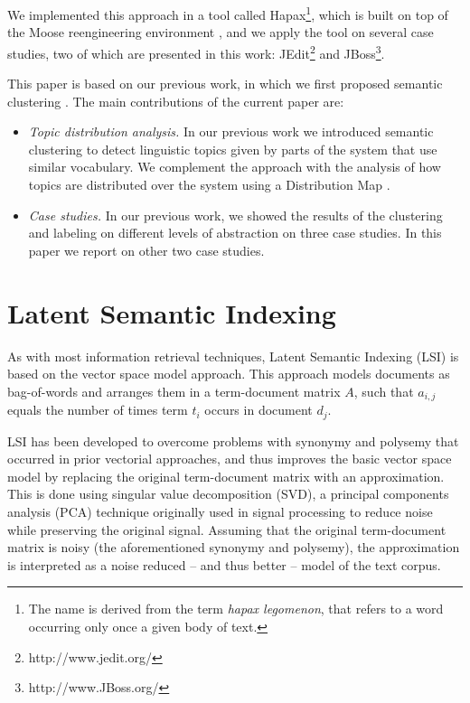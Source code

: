 \documentclass[10pt]{book}
\begin{document}
We implemented this approach in a tool called Hapax\footnote{The name is derived from the term \emph{hapax legomenon}, that refers to a word occurring only once a given body of text.}, which is built on top of the Moose reengineering environment \cite{Duca05a,Nier05c}, and we apply the tool on several case studies, two of which are presented in this work: JEdit\footnote{http://www.jedit.org/} and JBoss\footnote{http://www.JBoss.org/}.

This paper is based on our previous work, in which we first proposed semantic clustering \cite{Kuhn05a}. The main contributions of the current paper are:
\begin{itemize}

\item \emph{Topic distribution analysis.} In our previous work we introduced semantic clustering to detect linguistic topics given by parts of the system that use similar vocabulary. We complement the approach with the analysis of how topics are distributed over the system using a Distribution Map \cite{Duca06c}.

\item \emph{Case studies.} In our previous work, we showed the results of the clustering and labeling on different levels of abstraction on three case studies. In this paper we report on other two case studies.
\end{itemize}

\section{Latent Semantic Indexing}\label{sec:LSI}

As with most information retrieval techniques, Latent Semantic Indexing (LSI) is based on the vector space model approach. This approach models documents as bag-of-words and arranges them in a term-document matrix $A$, such that $a_{i,j}$ equals the number of times term $t_i$ occurs in document $d_j$.

LSI has been developed to overcome problems with synonymy and polysemy that occurred in prior vectorial approaches, and thus improves the basic vector space model by replacing the original term-document matrix with an approximation. This is done using singular value decomposition (SVD), a principal components analysis (PCA) technique originally used in signal processing to reduce noise while preserving the original signal. Assuming that the original term-document matrix is noisy (the aforementioned synonymy and polysemy), the approximation is interpreted as a noise reduced -- and thus better -- model of the text corpus.
\end{document}

